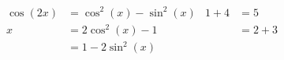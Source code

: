 \documentclass[a4paper]{article}
\begin{document}
\begin{align*}
	\cos(2x) &= \cos^2(x) - \sin^2(x) 	& 1+4 &= 5 \\
    x &= 2\cos^2(x) - 1 				& &= 2+3 \\
    &= 1 - 2\sin^2(x)
\end{align*}
\end{document}

